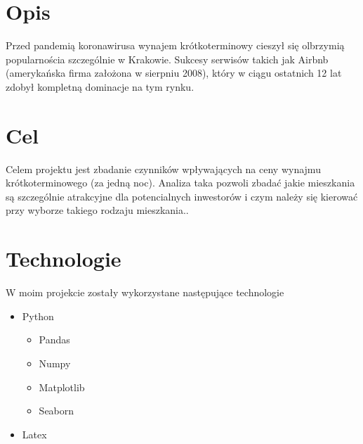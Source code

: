 \section{Opis}\label{sec:opis}

Przed pandemią koronawirusa wynajem krótkoterminowy cieszył się olbrzymią popularnościa szczególnie w Krakowie.
Sukcesy serwisów takich jak Airbnb (amerykańska firma założona w sierpniu 2008), który w ciągu ostatnich 12 lat zdobył kompletną dominacje na tym rynku.


\section{Cel}\label{sec:cel}
Celem projektu jest zbadanie czynników wpływających na ceny wynajmu krótkoterminowego (za jedną noc).
Analiza taka pozwoli zbadać jakie mieszkania są szczególnie atrakcyjne dla potencialnych inwestorów i czym należy się kierować przy wyborze takiego rodzaju mieszkania..

\section{Technologie}\label{sec:technologie}
W moim projekcie zostały wykorzystane następujące technologie
\begin{itemize}
    \item Python
    \begin{itemize}
        \item Pandas
        \item Numpy
        \item Matplotlib
        \item Seaborn
    \end{itemize}
    \item Latex
\end{itemize}
